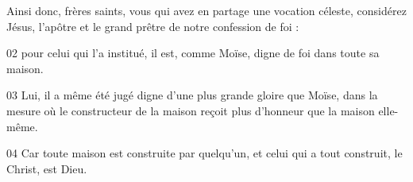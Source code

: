 Ainsi donc, frères saints, vous qui avez en partage une vocation céleste, considérez Jésus, l’apôtre et le grand prêtre de notre confession de foi :

02 pour celui qui l’a institué, il est, comme Moïse, digne de foi dans toute sa maison.

03 Lui, il a même été jugé digne d’une plus grande gloire que Moïse, dans la mesure où le constructeur de la maison reçoit plus d’honneur que la maison elle-même.

04 Car toute maison est construite par quelqu’un, et celui qui a tout construit, le Christ, est Dieu.
